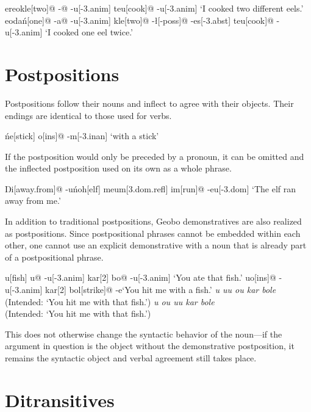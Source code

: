 \documentclass[a4paper,11pt,oneside,openany]{memoir}
\begin{document}
\pex
\a
\begingl
\vD er\engma[different]
\vs\vr eo\vd[eel]
kle[two]@
-\dbl[-{\sc poss}]@
-\vs u[\sc -3.anim]
te\vd[1]
\vr u[cook]@
-\vs u[\sc -3.anim]
\glft `I cooked two different eels.'
\endgl
\a
\begingl
\vS\vr eo\vd[eel]
da\'n[one]@
-a\dbl[\sc -poss]@
-\vs u[\sc -3.anim]
kle[two]@
-\l[\sc -poss]@
-es[\sc -3.abst]
te\vd[1]
\vr u[cook]@
-\vs u[\sc -3.anim]
\glft `I cooked one eel twice.'
\endgl
\xe

\section{Postpositions}

Postpositions follow their nouns and inflect to agree with their objects. Their endings are identical to those used for verbs.

\ex
\begingl
\vT\'ne{\vl}[stick]
\vc o[\sc ins]@
-m[\sc -3.inan]
\glft `with a stick'
\endgl
\xe

If the postposition would only be preceded by a pronoun, it can be omitted and the inflected postposition used on its own as a whole phrase.

\ex 
\begingl 
Ŋi[away.from]@
-\vd[-1]
\vn u\'noh[elf]
meum[\sc 3.dom.refl]
\vr im[run]@
-eu[\sc -3.dom]
\glft `The elf ran away from me.'
\endgl
\xe

In addition to traditional postpositions, Geobo{\engma} demonstratives are also realized as postpositions. Since postpositional phrases cannot be embedded within each other, one cannot use an explicit demonstrative with a noun that is already part of a postpositional phrase.

\pex
\a
\begingl
\Engma u{\vz}[fish]
u\vt[\sc med]@
-\vs u[\sc -3.anim]
kar[2]
bo\vs[eat]@
-\vs u[\sc -3.anim]
\glft `You ate that fish.'
\endgl
\a 
\begingl 
\Engma u\vz[fish]
\vc o[\sc ins]@
-\vs u[\sc -3.anim]
kar[2]
bol[strike]@
-e\vd[\sc -1]
\glft `You hit me with a fish.'
\endgl
\a \ljudge* \textit{\Engma u{\vz} u\vt\vs u \vc o\vs u kar bole\vd} \\
(Intended: `You hit me with that fish.')
\a \ljudge* \textit{\Engma u{\vz} \vc o\vs u u\vt\vs u kar bole\vd} \\
(Intended: `You hit me with that fish.')
\xe

This does not otherwise change the syntactic behavior of the noun---if the argument in question is the object without the demonstrative postposition, it remains the syntactic object and verbal agreement still takes place.

\section{Ditransitives}
\end{document}
